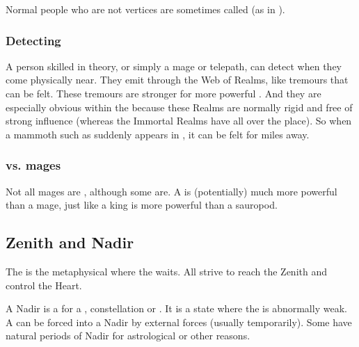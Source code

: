 Normal people who are not vertices are sometimes called  (as in ). 





\subsubsection{Detecting \vertices}
A person skilled in \matrix{} theory, or simply a mage or telepath, can detect \vertices{} when they come physically near. 
They emit  through the Web of Realms, like tremours that can be felt. 
These tremours are stronger for more powerful \vertices. 
And they are especially obvious within the  because these Realms are normally rigid and free of strong \vertex{} influence (whereas the Immortal Realms have \vertices{} all over the place). 
So when a mammoth \vertex{} such as \QuessanthIshnaruchaefir{} suddenly appears in \Azmith, it can be felt for miles away. 





\subsubsection{\Vertices vs. mages}
Not all mages are \vertices, although some are. 
A \vertex{} is (potentially) much more powerful than a mage, just like a king is more powerful than a sauropod. 









\subsection{Zenith and Nadir}
The  is the metaphysical  where the  waits. 
All \matrices{} strive to reach the Zenith and control the Heart. 

A Nadir is a  for a \matrix{}, constellation or \vertex. 
It is a state where the \matrix{} is abnormally weak. 
A \matrix{} can be forced into a Nadir by external forces (usually temporarily). 
Some \matrices{} have natural periods of Nadir for astrological or other reasons. 















